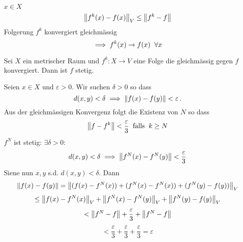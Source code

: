 \begin{Bem}
  $x\in X$
  \[\left\| f^k(x)-f(x) \right\|_V\leq \left\| f^k-f \right\|\]
  Folgerung $f^k$ konvergiert gleichmässig
  \[\implies f^k(x)\rightarrow f(x)\hspace{2mm}\forall x\]
\end{Bem}
\begin{Sat}
  Sei $X$ ein metrischer Raum und $f^k:X\to V$ eine Folge die gleichmässig gegen $f$ konvergiert. Dann ist $f$ stetig.
\end{Sat}
\begin{Bew}
  Seien $x\in X$ und $\varepsilon>0$. Wir suchen $\delta>0$ so dass
  \begin{equation}\label{e:ziel}
d(x,y)<\delta\implies\left\| f(x)-f(y) \right\|<\varepsilon\, .
\end{equation}
Aus der gleichm\"assigen Konvergenz folgt die Existenz von  $N$ so dass
  \[\left\| f-f^k \right\|<\frac{\varepsilon}{3}\hspace{2mm}\text{falls}\hspace{2mm} k\geq N\]
  $f^N$ ist stetig: $\exists \delta>0$:
  \[d(x,y)<\delta\implies \left\| f^N(x)-f^N(y) \right\|<\frac{\varepsilon}{3}\]
 Siene nun $x,y$ s.d. $d(x,y)<\delta$. Dann
  \[\left\| f(x)-f(y) \right\|=\left\| (f(x)-f^N(x))+(f^N(x)-f^N(x))+(f^N(y)-f(y)) \right\|_V\]
  \[\leq\left\| f(x)-f^N(x) \right\|_V+\left\| f^N(x)-f^N(y) \right\|_V+\left\| f^N(y)-f(y) \right\|_V\]
  \[<\left\| f^N-f \right\|+\frac{\varepsilon}{3}+\left\| f^N-f \right\|\]
  \[<\frac{\varepsilon}{3}+\frac{\varepsilon}{3}+\frac{\varepsilon}{3}=\varepsilon\]
\end{Bew}
